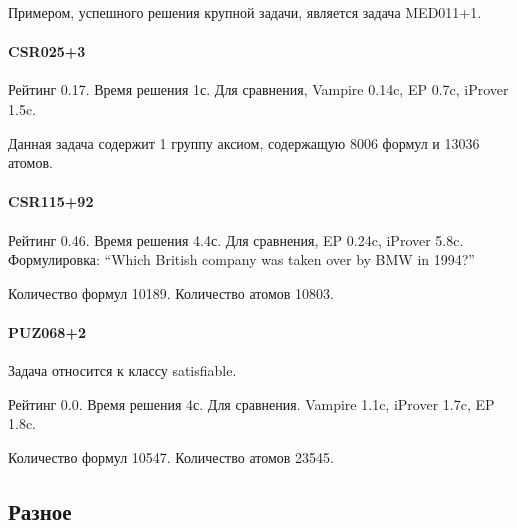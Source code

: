 Примером, успешного решения крупной задачи, является задача MED011+1.

\paragraph{CSR025+3}
Рейтинг 0.17. Время решения 1с. Для сравнения, Vampire 0.14c, EP 0.7c, iProver 1.5c.

Данная задача содержит 1 группу аксиом, содержащую 8006 формул и 13036 атомов.

\paragraph{CSR115+92}
Рейтинг 0.46. Время решения 4.4с. Для сравнения, EP 0.24c, iProver 5.8c.
Формулировка: ``Which British company was taken over by BMW in 1994?''

Количество формул 10189. Количество атомов 10803.


\paragraph{PUZ068+2}
Задача относится к классу satisfiable.

Рейтинг 0.0. Время решения 4с. Для сравнения. Vampire 1.1c, iProver 1.7c, EP 1.8c.


Количество формул 10547. Количество атомов 23545.




\subsection{Разное}






